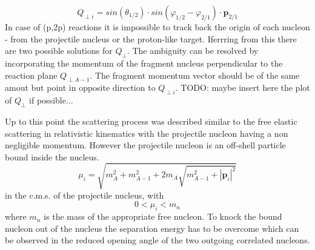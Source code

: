 \begin{equation}\label{eq:chulkov}
Q_{\perp i} = sin(\theta_{1/2})\cdot sin(\varphi_{1/2} -\varphi_{2/1})\cdot\mathbf{p}_{2/1}
\end{equation}
In case of (p,2p) reactions it is impossible to track back the origin of each nucleon - from the projectile nucleus or the proton-like target. Iferrring from this there are two possible solutions for $Q_{\perp}$. The ambiguity can be resolved by incorporating the momentum of the fragment nucleus perpendicular to the reaction plane $Q_{\perp A-1}$. The fragment momentum vector should be of the same amout but point in opposite direction to $Q_{\perp i}$.
TODO: maybe insert here the plot of $Q_{\perp}$ if possible...


Up to this point the scattering process was described similar to the free elastic scattering in relativistic kinematics with the projectile nucleon having a non negligible momentum. However the projectile nucleon is an off-shell particle  bound inside the nucleus. 
\begin{equation}
\mu_i =  \sqrt{m_A^2 + m_{A-1}^2 + 2m_A\sqrt{m_{A-1}^2 + |\mathbf{p}_i|^2}}
\end{equation}
in the c.m.s. of the projectile nucleus, with
\begin{equation}
0 < \mu_i  < m_n
\end{equation}
where $m_n$ is the mass of the appropriate free nucleon.
To knock the bound nucleon out of the nucleus the separation energy has to be overcome which can be observed in the reduced opening angle of the two outgoing correlated nucleons.



%

